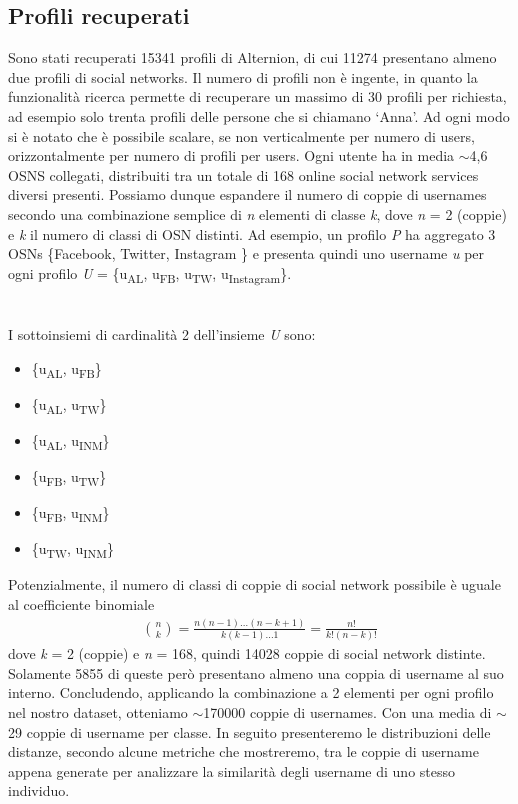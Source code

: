 \subsection{Profili recuperati}
Sono stati recuperati 15341 profili di Alternion, di cui 11274 presentano almeno due profili di social networks. Il numero di profili non è ingente, in quanto la funzionalità ricerca permette di recuperare un massimo di 30 profili per richiesta, ad esempio solo trenta profili delle persone che si chiamano `Anna'. Ad ogni modo si è notato che è possibile scalare, se non verticalmente per numero di users, orizzontalmente per numero di profili per users. Ogni utente ha in media $\sim$4,6 OSNS collegati, distribuiti tra un totale di 168 online social network services diversi presenti. Possiamo dunque espandere il numero di coppie di usernames secondo una combinazione semplice di \textit{n} elementi di classe \textit{k}, dove \textit{n} = 2 (coppie) e \textit{k} il numero di classi di OSN distinti. Ad esempio, un profilo \textit{P} ha aggregato 3 OSNs \{Facebook, Twitter, Instagram \} e presenta quindi uno username \textit{u} per ogni profilo
\textit{U} = \{u\textsubscript{AL}, u\textsubscript{FB}, u\textsubscript{TW}, u\textsubscript{Instagram}\}.\\ \\ \\ I sottoinsiemi di cardinalità 2 dell'insieme \textit{U} sono:
\begin{itemize}
  \item \{u\textsubscript{AL}, u\textsubscript{FB}\}
  \item \{u\textsubscript{AL}, u\textsubscript{TW}\}
  \item \{u\textsubscript{AL}, u\textsubscript{INM}\}
  \item \{u\textsubscript{FB}, u\textsubscript{TW}\}
  \item \{u\textsubscript{FB}, u\textsubscript{INM}\}
  \item \{u\textsubscript{TW}, u\textsubscript{INM}\}
\end{itemize}
Potenzialmente, il numero di classi di coppie di social network possibile è uguale al coefficiente binomiale
\begin{gather*}
  \binom nk = \frac{n(n-1)\ldots(n-k+1)}{k(k-1)\dots1} = \frac{n!}{k!(n-k)!}
\end{gather*} dove \textit{k} = 2 (coppie) e \textit{n} = 168, quindi 14028 coppie di social network distinte. Solamente 5855 di queste però presentano almeno una coppia di username al suo interno. Concludendo, applicando la combinazione a 2 elementi per ogni profilo nel nostro dataset, otteniamo $\sim$170000 coppie di usernames. Con una media di $\sim$29 coppie di username per classe. In seguito presenteremo le distribuzioni delle distanze, secondo alcune metriche che mostreremo, tra le coppie di username appena generate per analizzare la similarità degli username di uno stesso individuo.

